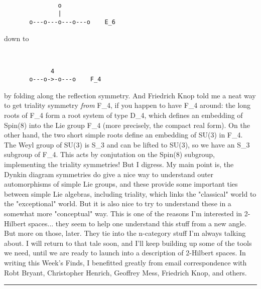 \begin{verbatim}

               o  
               |          
       o---o---o---o---o    E_6

\end{verbatim}
    
down to

\begin{verbatim}


             4
       o---o->-o---o    F_4

\end{verbatim}
    
by folding along the reflection symmetry.  And Friedrich Knop
told me a neat way to get triality symmetry \emph{from} F_4, if you
happen to have F_4 around: the long roots of F_4 form a root system
of type D_4, which defines an embedding of Spin(8) into the Lie
group F_4 (more precisely, the compact real form).  On the other
hand, the two short simple roots define an embedding of SU(3)
in F_4.  The Weyl group of SU(3) is S_3 and can be lifted to
SU(3), so we have an S_3 subgroup of F_4.  This acts by conjutation
on the Spin(8) subgroup, implementing the triality symmetries!
But I digress.  My main point is, the Dynkin diagram symmetries
do give a nice way to understand outer automorphisms of simple
Lie groups, and these provide some important ties between simple
Lie algebras, including triality, which links the "classical" 
world to the "exceptional" world.  But it is also nice to try
to understand these in a somewhat more "conceptual" way.  This is one of the
reasons I'm interested in 2-Hilbert spaces... they seem to help
one understand this stuff from a new angle.  But more on those,
later.  They tie into the n-category stuff I'm always talking
about.  I will return to that tale soon, and I'll keep building
up some of the tools we need, until we are ready to launch
into a description of 2-Hilbert spaces. 
In writing this Week's Finds, I benefitted greatly from email
correspondence with Robt Bryant, Christopher Henrich, 
Geoffrey Mess, Friedrich Knop, and others.
\par\noindent\rule{\textwidth}{0.4pt}

